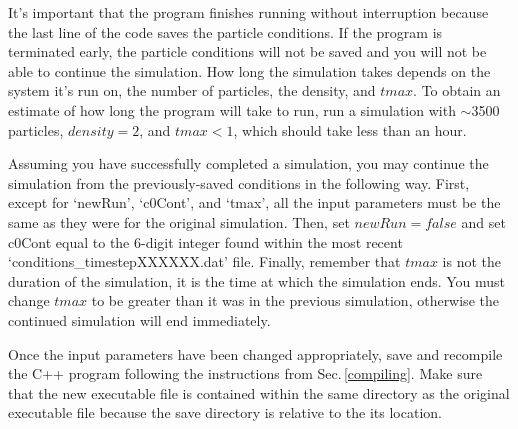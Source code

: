 \documentclass{article}
\begin{document}
	It's important that the program finishes running without interruption because the last line of the code saves the particle conditions.  If the program is terminated early, the particle conditions will not be saved and you will not be able to continue the simulation. How long the simulation takes depends on the system it's run on, the number of particles, the density, and $tmax$. To obtain an estimate of how long the program will take to run, run a simulation with $\sim$3500 particles, $density=2$, and $tmax<1$, which should take less than an hour. 
	
	Assuming you have successfully completed a simulation, you may continue the simulation from the previously-saved conditions in the following way. First, except for `newRun', `c0Cont', and `tmax', all the input parameters must be the same as they were for the original simulation. Then, set $newRun=false$ and set c0Cont equal to the 6-digit integer found within the most recent `conditions\_timestepXXXXXX.dat' file. Finally, remember that $tmax$ is not the duration of the simulation, it is the time at which the simulation ends. You must change $tmax$ to be greater than it was in the previous simulation, otherwise the continued simulation will end immediately.
	
	Once the input parameters have been changed appropriately, save and recompile the C++ program following the instructions from Sec.\,\ref{compiling}. Make sure that the new executable file is contained within the same directory as the original executable file because the save directory is relative to the its location.
	
	

	
\end{document}
